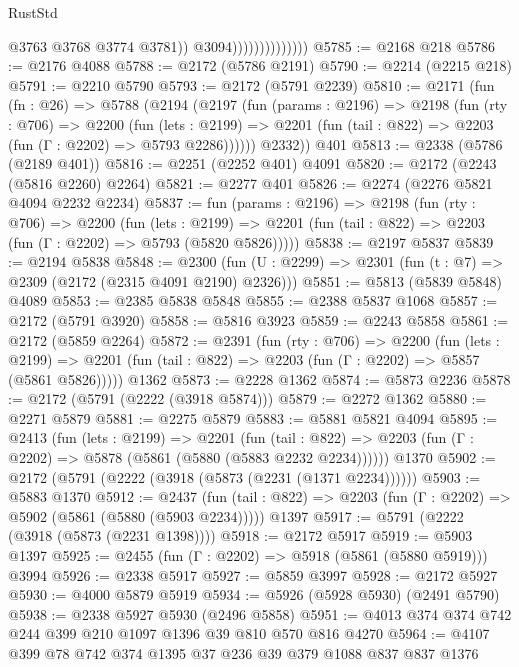 \begin{lexlean}{RustStd}
\begin{coremodule}
                                    @3763
                                    @3768
                                    @3774
                                    @3781))
                                @3094))))))))))))))
@5785 := @2168 @218
@5786 := @2176 @4088
@5788 := @2172 (@5786 @2191)
@5790 := @2214 (@2215 @218)
@5791 := @2210 @5790
@5793 := @2172 (@5791 @2239)
@5810 := @2171
    (fun (fn : @26) =>
    @5788
      (@2194
        (@2197
          (fun (params : @2196) =>
          @2198
            (fun (rty : @706) =>
            @2200
              (fun (lets : @2199) =>
              @2201 (fun (tail : @822) => @2203 (fun (Γ : @2202) => @5793 @2286))))))
        @2332))
    @401
@5813 := @2338 (@5786 (@2189 @401))
@5816 := @2251 (@2252 @401) @4091
@5820 := @2172 (@2243 (@5816 @2260) @2264)
@5821 := @2277 @401
@5826 := @2274 (@2276 @5821 @4094 @2232 @2234)
@5837 := fun (params : @2196) =>
  @2198
    (fun (rty : @706) =>
    @2200
      (fun (lets : @2199) =>
      @2201 (fun (tail : @822) => @2203 (fun (Γ : @2202) => @5793 (@5820 @5826)))))
@5838 := @2197 @5837
@5839 := @2194 @5838
@5848 := @2300 (fun (U : @2299) => @2301 (fun (t : @7) => @2309 (@2172 (@2315 @4091 @2190) @2326)))
@5851 := @5813 (@5839 @5848) @4089
@5853 := @2385 @5838 @5848
@5855 := @2388 @5837 @1068
@5857 := @2172 (@5791 @3920)
@5858 := @5816 @3923
@5859 := @2243 @5858
@5861 := @2172 (@5859 @2264)
@5872 := @2391
    (fun (rty : @706) =>
    @2200
      (fun (lets : @2199) =>
      @2201 (fun (tail : @822) => @2203 (fun (Γ : @2202) => @5857 (@5861 @5826)))))
    @1362
@5873 := @2228 @1362
@5874 := @5873 @2236
@5878 := @2172 (@5791 (@2222 (@3918 @5874)))
@5879 := @2272 @1362
@5880 := @2271 @5879
@5881 := @2275 @5879
@5883 := @5881 @5821 @4094
@5895 := @2413
    (fun (lets : @2199) =>
    @2201
      (fun (tail : @822) => @2203 (fun (Γ : @2202) => @5878 (@5861 (@5880 (@5883 @2232 @2234))))))
    @1370
@5902 := @2172 (@5791 (@2222 (@3918 (@5873 (@2231 (@1371 @2234))))))
@5903 := @5883 @1370
@5912 := @2437
    (fun (tail : @822) => @2203 (fun (Γ : @2202) => @5902 (@5861 (@5880 (@5903 @2234)))))
    @1397
@5917 := @5791 (@2222 (@3918 (@5873 (@2231 @1398))))
@5918 := @2172 @5917
@5919 := @5903 @1397
@5925 := @2455 (fun (Γ : @2202) => @5918 (@5861 (@5880 @5919))) @3994
@5926 := @2338 @5917
@5927 := @5859 @3997
@5928 := @2172 @5927
@5930 := @4000 @5879 @5919
@5934 := @5926 (@5928 @5930) (@2491 @5790)
@5938 := @2338 @5927 @5930 (@2496 @5858)
@5951 := @4013 @374 @374 @742 @244 @399 @210 @1097 @1396 @39 @810 @570 @816 @4270
@5964 := @4107 @399 @78 @742 @374 @1395 @37 @236 @39 @379 @1088 @837 @837 @1376

\end{coremodule}
\end{lexlean}
